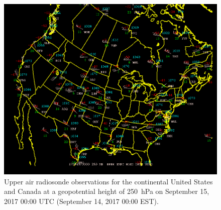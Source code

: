 \documentclass[11pt]{article}
\begin{document}
\begin{figure}
  \centering
  \includegraphics[width=\textwidth]{radiosondeUSA250hPa.png}
  \caption{Upper air radiosonde observations for the continental United States and Canada at a geopotential height of \SI{250}{\hecto\Pa} on September 15, 2017 00:00 UTC (September 14, 2017 00:00 EST).}
  \label{fig:radiosonde250hPa}
\end{figure}
\end{document}
